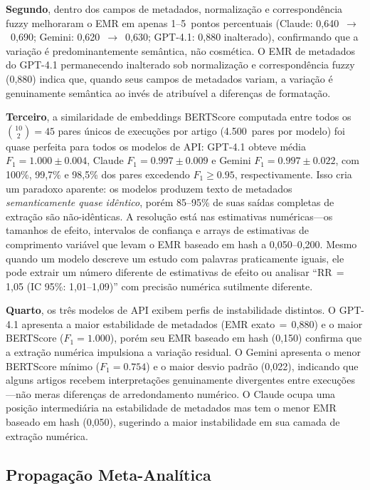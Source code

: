 \documentclass[12pt, a4paper]{article}
\begin{document}
\textbf{Segundo}, dentro dos campos de metadados, normalização e correspondência fuzzy melhoraram o EMR em apenas 1--5~pontos percentuais (Claude: 0,640~$\to$~0,690; Gemini: 0,620~$\to$~0,630; GPT-4.1: 0,880 inalterado), confirmando que a variação é predominantemente semântica, não cosmética.
O EMR de metadados do GPT-4.1 permanecendo inalterado sob normalização e correspondência fuzzy (0,880) indica que, quando seus campos de metadados variam, a variação é genuinamente semântica ao invés de atribuível a diferenças de formatação.

\textbf{Terceiro}, a similaridade de embeddings BERTScore computada entre todos os $\binom{10}{2}{=}45$ pares únicos de execuções por artigo (4.500~pares por modelo) foi quase perfeita para todos os modelos de API: GPT-4.1 obteve média $F_1{=}1.000 \pm 0.004$, Claude $F_1{=}0.997 \pm 0.009$ e Gemini $F_1{=}0.997 \pm 0.022$, com 100\%, 99,7\% e 98,5\% dos pares excedendo $F_1{\geq}0.95$, respectivamente.
Isso cria um paradoxo aparente: os modelos produzem texto de metadados \emph{semanticamente quase idêntico}, porém 85--95\% de suas saídas completas de extração são não-idênticas.
A resolução está nas estimativas numéricas---os tamanhos de efeito, intervalos de confiança e arrays de estimativas de comprimento variável que levam o EMR baseado em hash a 0,050--0,200.
Mesmo quando um modelo descreve um estudo com palavras praticamente iguais, ele pode extrair um número diferente de estimativas de efeito ou analisar ``RR$\,{=}\,$1,05 (IC 95\%: 1,01--1,09)'' com precisão numérica sutilmente diferente.

\textbf{Quarto}, os três modelos de API exibem perfis de instabilidade distintos.
O GPT-4.1 apresenta a maior estabilidade de metadados (EMR exato$\,{=}\,$0,880) e o maior BERTScore ($F_1{=}1.000$), porém seu EMR baseado em hash (0,150) confirma que a extração numérica impulsiona a variação residual.
O Gemini apresenta o menor BERTScore mínimo ($F_1{=}0.754$) e o maior desvio padrão (0,022), indicando que alguns artigos recebem interpretações genuinamente divergentes entre execuções---não meras diferenças de arredondamento numérico.
O Claude ocupa uma posição intermediária na estabilidade de metadados mas tem o menor EMR baseado em hash (0,050), sugerindo a maior instabilidade em sua camada de extração numérica.

\subsection{Propagação Meta-Analítica}
\label{sec:metaprop}
\end{document}

